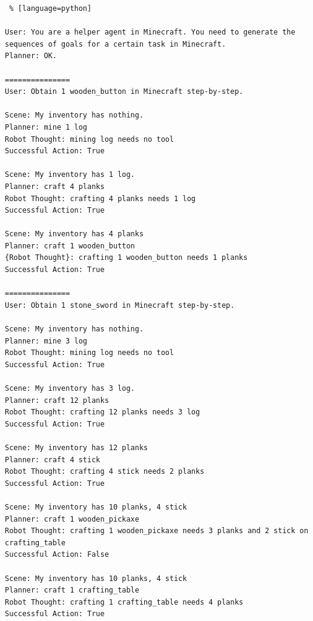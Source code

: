 \begin{lstlisting} % [language=python]  

User: You are a helper agent in Minecraft. You need to generate the sequences of goals for a certain task in Minecraft.
Planner: OK.

===============
User: Obtain 1 wooden_button in Minecraft step-by-step.

Scene: My inventory has nothing.
Planner: mine 1 log
Robot Thought: mining log needs no tool
Successful Action: True

Scene: My inventory has 1 log.
Planner: craft 4 planks
Robot Thought: crafting 4 planks needs 1 log
Successful Action: True

Scene: My inventory has 4 planks
Planner: craft 1 wooden_button
{Robot Thought}: crafting 1 wooden_button needs 1 planks
Successful Action: True

===============
User: Obtain 1 stone_sword in Minecraft step-by-step.

Scene: My inventory has nothing.
Planner: mine 3 log
Robot Thought: mining log needs no tool
Successful Action: True

Scene: My inventory has 3 log.
Planner: craft 12 planks
Robot Thought: crafting 12 planks needs 3 log
Successful Action: True

Scene: My inventory has 12 planks
Planner: craft 4 stick
Robot Thought: crafting 4 stick needs 2 planks
Successful Action: True

Scene: My inventory has 10 planks, 4 stick
Planner: craft 1 wooden_pickaxe
Robot Thought: crafting 1 wooden_pickaxe needs 3 planks and 2 stick on crafting_table
Successful Action: False

Scene: My inventory has 10 planks, 4 stick
Planner: craft 1 crafting_table
Robot Thought: crafting 1 crafting_table needs 4 planks
Successful Action: True


\end{lstlisting}
